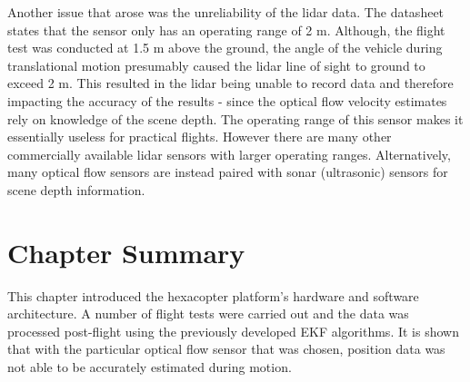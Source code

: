 Another issue that arose was the unreliability of the lidar data. The datasheet states that the sensor only has an operating range of 2 m. Although, the flight test was conducted at 1.5 m above the ground, the angle of the vehicle during translational motion presumably caused the lidar line of sight to ground to exceed 2 m. This resulted in the lidar being unable to record data and therefore impacting the accuracy of the results - since the optical flow velocity estimates rely on knowledge of the scene depth. The operating range of this sensor makes it essentially useless for practical flights. However there are many other commercially available lidar sensors with larger operating ranges. Alternatively, many optical flow sensors are instead paired with sonar (ultrasonic) sensors for scene depth information.



\section{Chapter Summary}
This chapter introduced the hexacopter platform's hardware and software architecture. A number of flight tests were carried out and the data was processed post-flight using the previously developed EKF algorithms. It is shown that with the particular optical flow sensor that was chosen, position data was not able to be accurately estimated during motion.

\clearpage


